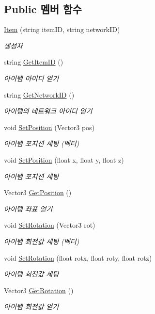 \subsection*{Public 멤버 함수}
\begin{DoxyCompactItemize}
\item 
\hyperlink{class_item_a08bbc0cfcebaee215cdcc6ea910850eb}{Item} (string item\+ID, string network\+ID)
\begin{DoxyCompactList}\small\item\em 생성자 \end{DoxyCompactList}\item 
string \hyperlink{class_item_a449b9493c2980231cd23633d935568e0}{Get\+Item\+ID} ()
\begin{DoxyCompactList}\small\item\em 아이템 아이디 얻기 \end{DoxyCompactList}\item 
string \hyperlink{class_item_ab3ee43a2b973e4a595e65ce44c68ad18}{Get\+Network\+ID} ()
\begin{DoxyCompactList}\small\item\em 아이템의 네트워크 아이디 얻기 \end{DoxyCompactList}\item 
void \hyperlink{class_item_ae98790cd9fb0ef12e3bfc8149db4453f}{Set\+Position} (Vector3 pos)
\begin{DoxyCompactList}\small\item\em 아이템 포지션 세팅 (벡터) \end{DoxyCompactList}\item 
void \hyperlink{class_item_ab4bb5f402c4ab8829c70d02c44128faa}{Set\+Position} (float x, float y, float z)
\begin{DoxyCompactList}\small\item\em 아이템 포지션 세팅 \end{DoxyCompactList}\item 
Vector3 \hyperlink{class_item_a557cd503b1645e0e610ee66ad25f283c}{Get\+Position} ()
\begin{DoxyCompactList}\small\item\em 아이템 좌표 얻기 \end{DoxyCompactList}\item 
void \hyperlink{class_item_a9886c6d5ae9a2778d5e8b1526d29f27e}{Set\+Rotation} (Vector3 rot)
\begin{DoxyCompactList}\small\item\em 아이템 회전값 세팅 (벡터) \end{DoxyCompactList}\item 
void \hyperlink{class_item_af114b32d99e586a29f849ed4f3579d2c}{Set\+Rotation} (float rotx, float roty, float rotz)
\begin{DoxyCompactList}\small\item\em 아이템 회전값 세팅 \end{DoxyCompactList}\item 
Vector3 \hyperlink{class_item_a6c9f4e62259d7ff025f5e4d09597cdba}{Get\+Rotation} ()
\begin{DoxyCompactList}\small\item\em 아이템 회전값 얻기 \end{DoxyCompactList}\end{DoxyCompactItemize}

